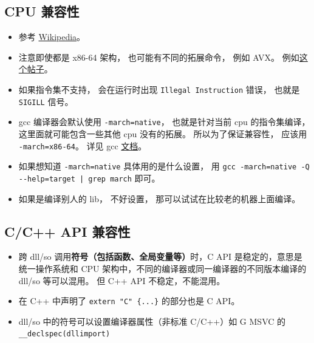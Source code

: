 
\begin{issues}
\issueDraft
\end{issues}


\subsection{CPU 兼容性}

\begin{itemize}
\item 参考 \href{https://en.wikipedia.org/wiki/Binary-code_compatibility}{Wikipedia}。
\item 注意即使都是 x86-64 架构， 也可能有不同的拓展命令， 例如 AVX。 例如\href{https://stackoverflow.com/questions/50945287/illegal-instruction-when-run-precompiled-program-on-other-machine}{这个帖子}。
\item 如果指令集不支持， 会在运行时出现 \verb`Illegal Instruction` 错误， 也就是 \verb`SIGILL` 信号。
\item gcc 编译器会默认使用 \verb`-march=native`， 也就是针对当前 cpu 的指令集编译， 这里面就可能包含一些其他 cpu 没有的拓展。 所以为了保证兼容性， 应该用 \verb`-march=x86-64`。 详见 gcc \href{https://gcc.gnu.org/onlinedocs/gcc/x86-Options.html}{文档}。
\item 如果想知道 \verb`-march=native` 具体用的是什么设置， 用 \verb`gcc -march=native -Q --help=target | grep march` 即可。
\item 如果是编译别人的 lib， 不好设置， 那可以试试在比较老的机器上面编译。
\end{itemize}

\subsection{C/C++ API 兼容性}
\begin{itemize}
\item 跨 dll/so 调用\textbf{符号（包括函数、全局变量等）}时，C API 是稳定的，意思是统一操作系统和 CPU 架构中，不同的编译器或同一编译器的不同版本编译的 dll/so 等可以混用。 但 C++ API 不稳定，不能混用。
\item 在 C++ 中声明了 \verb`extern "C" {...}` 的部分也是 C API。
\item dll/so 中的符号可以设置编译器属性（非标准 C/C++）如 G MSVC 的 \verb`__declspec(dllimport)`
\end{itemize}

